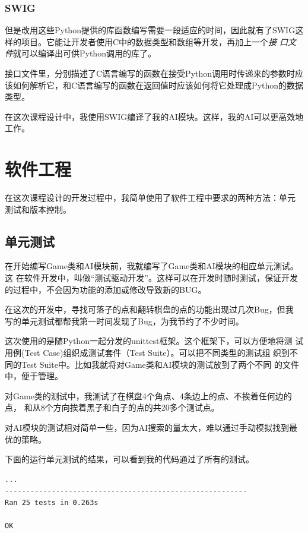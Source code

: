 \documentclass[oneside,a4paper]{article}
\begin{document}
\subsubsection{SWIG}
\label{sec:swig}
但是改用这些Python提供的库函数编写需要一段适应的时间，因此就有了SWIG这
样的项目。它能让开发者使用C中的数据类型和数组等开发，再加上一个\emph{接
  口文件}就可以编译出可供Python调用的库了。

接口文件里，分别描述了C语言编写的函数在接受Python调用时传递来的参数时应
该如何解析它，和C语言编写的函数在返回值时应该如何将它处理成Python的数据
类型。

在这次课程设计中，我使用SWIG编译了我的AI模块。这样，我的AI可以更高效地
工作。

\section{软件工程}
\label{sec:software_engineering}

在这次课程设计的开发过程中，我简单使用了软件工程中要求的两种方法：单元
测试和版本控制。

\subsection{单元测试}
\label{sec:unittest}
在开始编写Game类和AI模块前，我就编写了Game类和AI模块的相应单元测试。这
在软件开发中，叫做``测试驱动开发''。这样可以在开发时随时测试，保证开发
的过程中，不会因为功能的添加或修改导致新的BUG。

在这次的开发中，寻找可落子的点和翻转棋盘的点的功能出现过几次Bug，但我
写的单元测试都帮我第一时间发现了Bug，为我节约了不少时间。

这次使用的是随Python一起分发的unittest框架。这个框架下，可以方便地将测
试用例(Test Case)组织成测试套件（Test Suite）。可以把不同类型的测试组
织到不同的Test Suite中。比如我就将对Game类和AI模块的测试放到了两个不同
的文件中，便于管理。

对Game类的测试中，我测试了在棋盘4个角点、4条边上的点、不挨着任何边的点，
和从8个方向挨着黑子和白子的点的共20多个测试点。

对AI模块的测试相对简单一些，因为AI搜索的量太大，难以通过手动模拟找到最
优的策略。

下面的运行单元测试的结果，可以看到我的代码通过了所有的测试。

\begin{verbatim}
...
---------------------------------------------------------
Ran 25 tests in 0.263s

OK
\end{verbatim}
\end{document}
